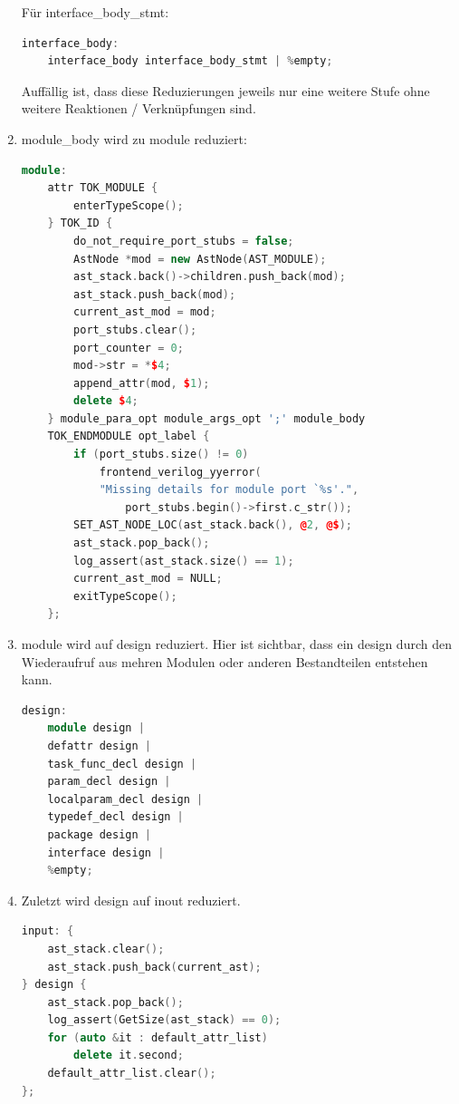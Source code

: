 \documentclass[11pt]{report}
\begin{document}
\begin{enumerate}
Für interface\_body\_stmt:
\begin{lstlisting}[language=C++]
	interface_body:
	interface_body interface_body_stmt | %empty;
\end{lstlisting}

Auffällig ist, dass diese Reduzierungen jeweils nur eine weitere Stufe ohne weitere Reaktionen / Verknüpfungen sind.
\item
module\_body wird zu module reduziert:
\begin{lstlisting}[language=C++]
	module:
	attr TOK_MODULE {
		enterTypeScope();
	} TOK_ID {
		do_not_require_port_stubs = false;
		AstNode *mod = new AstNode(AST_MODULE);
		ast_stack.back()->children.push_back(mod);
		ast_stack.push_back(mod);
		current_ast_mod = mod;
		port_stubs.clear();
		port_counter = 0;
		mod->str = *$4;
		append_attr(mod, $1);
		delete $4;
	} module_para_opt module_args_opt ';' module_body 
	TOK_ENDMODULE opt_label {
		if (port_stubs.size() != 0)
			frontend_verilog_yyerror(
			"Missing details for module port `%s'.",
				port_stubs.begin()->first.c_str());
		SET_AST_NODE_LOC(ast_stack.back(), @2, @$);
		ast_stack.pop_back();
		log_assert(ast_stack.size() == 1);
		current_ast_mod = NULL;
		exitTypeScope();
	};
\end{lstlisting}

\item
module wird auf design reduziert. Hier ist sichtbar, dass ein design durch den Wiederaufruf aus mehren Modulen oder anderen Bestandteilen entstehen kann.

\begin{lstlisting}[language=C++]
	design:
	module design |
	defattr design |
	task_func_decl design |
	param_decl design |
	localparam_decl design |
	typedef_decl design |
	package design |
	interface design |
	%empty;
\end{lstlisting}

\item
Zuletzt wird design auf inout reduziert.
\begin{lstlisting}[language=C++]
	input: {
	ast_stack.clear();
	ast_stack.push_back(current_ast);
} design {
	ast_stack.pop_back();
	log_assert(GetSize(ast_stack) == 0);
	for (auto &it : default_attr_list)
		delete it.second;
	default_attr_list.clear();
};
\end{lstlisting}

\end{enumerate}
\end{document}
